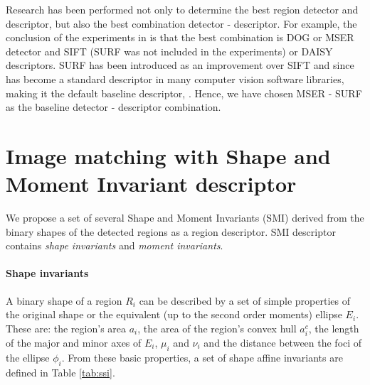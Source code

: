 \documentclass[a4paper,11pt]{article}
\begin{document}
Research has been performed not only to determine the best region detector and descriptor, but also the best combination detector - descriptor.
For example, the conclusion of the experiments in \cite{DahlAP11} is that the best combination is DOG or MSER detector and SIFT (SURF was not included in the experiments) or DAISY descriptors. SURF has been introduced as an improvement over SIFT and since has become a standard descriptor in many computer vision software libraries, making it the default baseline descriptor, \cite{Bay2008}.
Hence, we have chosen MSER - SURF as the baseline detector - descriptor combination.

\section{Image matching with Shape and Moment Invariant descriptor}\label{sec:match}
We propose a set of several Shape and Moment Invariants (SMI) derived from the binary shapes of the detected regions as a region descriptor. SMI descriptor contains {\em shape invariants} and {\em moment invariants}.

\paragraph{Shape invariants}
A binary shape of a region $R_i$ can be described by a set of simple properties of the original shape or the equivalent (up to the second order moments) ellipse $E_i$. These are: the region's area $a_i$, the area of the region's convex hull $a^c_i$, the length of the major and minor axes of $E_i$, $\mu_i$ and $\nu_i$ and the distance between the foci of the ellipse $\phi_i$. From these basic properties, a set of shape affine invariants are defined in Table \ref{tab:ssi}.   
\end{document}
